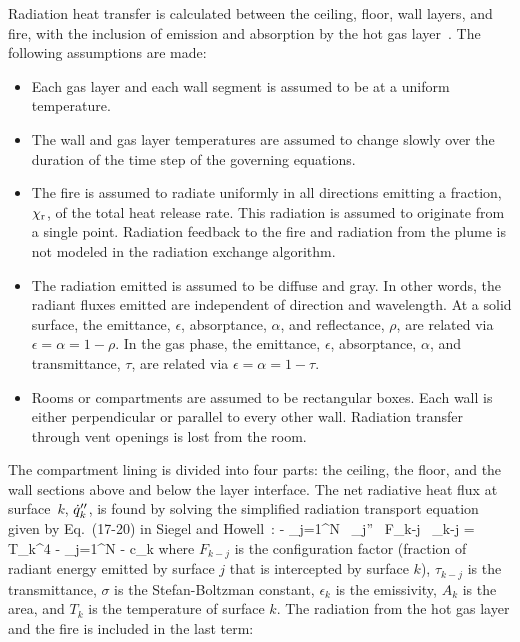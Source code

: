 \documentclass[12pt]{book}
\begin{document}
Radiation heat transfer is calculated between the ceiling, floor, wall layers, and fire, with the inclusion of emission and absorption by the hot gas layer~\cite{Forney_radiation}. The following assumptions are made:
\begin{itemize}
\item Each gas layer and each wall segment is assumed to be at a uniform temperature.
\item The wall and gas layer temperatures are assumed to change slowly over the duration of the time step of the governing equations.
\item The fire is assumed to radiate uniformly in all directions emitting a fraction, $\chi_{\rm r}$, of the total heat release rate.  This radiation is assumed to originate from a single point.  Radiation feedback to the fire and radiation from the plume is not modeled in the radiation exchange algorithm.
\item The radiation emitted is assumed to be diffuse and gray.  In other words, the radiant fluxes emitted are independent of direction and wavelength. At a solid surface, the emittance, $\epsilon$, absorptance, $\alpha$, and reflectance, $\rho$, are related via $\epsilon = \alpha = 1 - \rho$. In the gas phase, the emittance, $\epsilon$, absorptance, $\alpha$, and transmittance, $\tau$, are related via $\epsilon = \alpha = 1 - \tau$.
\item Rooms or compartments are assumed to be rectangular boxes.  Each wall is either perpendicular or parallel to every other wall.  Radiation transfer through vent openings is lost from the room.
\end{itemize}
The compartment lining is divided into four parts: the ceiling, the floor, and the wall sections above and below the layer interface. The net radiative heat flux at surface~$k$, $\dot{q}_k''$, is found by solving the simplified radiation transport equation given by Eq.~(17-20) in Siegel and Howell~\cite{SiegelandHowell:1981}:
\be
    - \displaystyle\sum_{j=1}^N  \, \dq_j'' \, F_{k-j} \, \tau_{k-j} = \sigma T_k^4 - \displaystyle\sum_{j=1}^N  - c_k \label{RTE}
\ee
where $F_{k-j}$ is the configuration factor (fraction of radiant energy emitted by surface $j$ that is intercepted by surface $k$), $\tau_{k-j}$ is the transmittance, $\sigma$ is the Stefan-Boltzman constant, $\epsilon_k$ is the emissivity, $A_k$ is the area, and $T_k$ is the temperature of surface $k$. The radiation from the hot gas layer and the fire is included in the last term:
\end{document}
